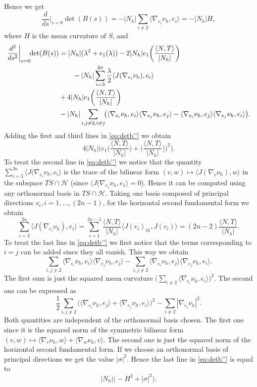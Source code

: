 \documentclass[10pt]{amsart}
\theoremstyle{definition}
\theoremstyle{remark}
\numberwithin{equation}{section}
\begin{document}
Hence we get
\[
\frac{d}{ds}\bigg|_{s=0}\det(B(s))=-{|N_{h}|}\sum_{i\neq 2}{\langle{\nabla_{e_i}{\nu_{h}},e_i}\rangle}=-{|N_{h}|} H,
\]
where $H$ is the mean curvature of $S$, and
\begin{align}
\frac{d^2}{ds^2}\bigg|_{s=0}\!\!\det(B(s))&={|N_{h}|}({\lambda}^2+e_1({\lambda}))-2{|N_{h}|} e_1\bigg({\frac{{\langle{N,T}\rangle}}{|N_h|}}\bigg)\notag
\\
\label{eq:detb''}
&\qquad-{|N_{h}|}\sum_{i=3}^{2n}\frac{\lambda}{2}{\langle{J(\nabla_{e_i}{\nu_{h}}),e_i}\rangle}
\\
&+4{|N_{h}|} e_1\bigg({\frac{{\langle{N,T}\rangle}}{|N_h|}}\bigg)\notag
\\
&-{|N_{h}|}\sum_{i,j\neq 2, i\neq j}\!\!\big({\langle{\nabla_{e_i}{\nu_{h}},e_i}\rangle}{\langle{\nabla_{e_j}{\nu_{h}},e_j}\rangle}-{\langle{\nabla_{e_i}{\nu_{h}},e_j}\rangle}{\langle{\nabla_{e_j}{\nu_{h}},e_i}\rangle}\big).\notag
\end{align}
Adding the first and third lines in \eqref{eq:detb''} we obtain
\[
4{|N_{h}|}\bigg(e_1\bigg({\frac{{\langle{N,T}\rangle}}{|N_h|}}\bigg)+\bigg({\frac{{\langle{N,T}\rangle}}{|N_h|}})\bigg)^2\bigg).
\]
To treat the second line in \eqref{eq:detb''} we notice that the quantity $\sum_{i=3}^{2n}{\langle{J(\nabla_{e_i}{\nu_{h}},e_i}\rangle}$ is the trace of the bilinear form $(v,w)\mapsto {\langle{J(\nabla_v{\nu_{h}}),w}\rangle}$ in the subspace $TS\cap{\mathcal{H}}$ (since ${\langle{J(\nabla_{e_1}{\nu_{h}},e_1}\rangle}=0$). Hence it can be computed using any orthonormal basis in $TS\cap{\mathcal{H}}$. Taking one basis composed of principal directions $v_i, i=1,\ldots,(2n-1)$, for the horizontal second fundamental form we obtain
\[
\sum_{i=3}^{2n}{\langle{J(\nabla_{e_i}{\nu_{h}}),e_i}\rangle}=\sum_{i=1}^{2n-1} {\frac{{\langle{N,T}\rangle}}{|N_h|}}{\langle{J(v_i)_{th},J(v_i)}\rangle}=(2n-2){\frac{{\langle{N,T}\rangle}}{|N_h|}}.
\]
To treat the last line in \eqref{eq:detb''} we first notice that the terms corresponding to $i=j$ can be added since they all vanish. This way we obtain
\[
\sum_{i,j\neq 2}{\langle{\nabla_{e_i}{\nu_{h}},e_i}\rangle}{\langle{\nabla_{e_j}{\nu_{h}},e_j}\rangle}-\sum_{i,j\neq 2}{\langle{\nabla_{e_i}{\nu_{h}},e_j}\rangle}{\langle{\nabla_{e_j}{\nu_{h}},e_i}\rangle}.
\]
The first sum is just the squared mean curvature $\big(\sum_{i\neq 2}{\langle{\nabla_{e_i}{\nu_{h}},e_i}\rangle}\big)^2$. The second one can be expressed as
\[
\frac{1}{2}\sum_{i,j\neq 2}\big({\langle{\nabla_{e_i}{\nu_{h}},e_j}\rangle}+{\langle{\nabla_{e_j}{\nu_{h}},e_i}\rangle}\big)^2-\sum_{i\neq 2}|\nabla_{e_i}{\nu_{h}}|^2.
\]
Both quantities are independent of the orthonormal basis chosen. The first one since it is the squared norm of the symmetric bilinear form $(v,w)\mapsto {\langle{\nabla_v{\nu_{h}},w}\rangle}+{\langle{\nabla_w{\nu_{h}},v}\rangle}$. The second one is just the squared norm of the horizontal second fundamental form. If we choose an orthonormal basis of principal directions we get the value $|{\sigma}|^2$. Hence the last line in \eqref{eq:detb''} is equal to
\[
{|N_{h}|}\big(-H^2+|{\sigma}|^2\big).
\]
\end{document}
